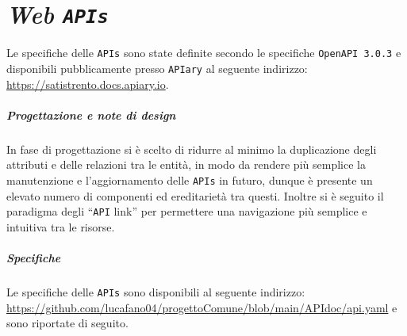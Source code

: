 \chapter{\textit{Web \texttt{APIs}}}
Le specifiche delle \texttt{APIs} sono state definite secondo le specifiche \texttt{OpenAPI 3.0.3} e disponibili pubblicamente presso \texttt{APIary} al seguente indirizzo: \url{https://satistrento.docs.apiary.io}.

\paragraph{Progettazione e note di design} In fase di progettazione si è scelto di ridurre al minimo la duplicazione degli attributi e delle relazioni tra le entità, in modo da rendere più semplice la manutenzione e l'aggiornamento delle \texttt{APIs} in futuro, dunque è presente un elevato numero di componenti ed ereditarietà tra questi. Inoltre si è seguito il paradigma degli ``\texttt{API} link'' per permettere una navigazione più semplice e intuitiva tra le risorse.

\paragraph{Specifiche} Le specifiche delle \texttt{APIs} sono disponibili al seguente indirizzo: \url{https://github.com/lucafano04/progettoComune/blob/main/APIdoc/api.yaml} e sono riportate di seguito.


